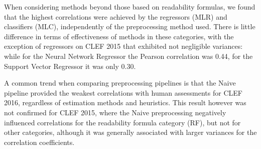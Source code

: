 When considering methods beyond those based on readability formulas, we found that the highest correlations were achieved by the regressors (MLR) and classifiers (MLC), independently of the preprocessing method used. There is little difference in terms of effectiveness of methods in these categories, with the exception of regressors on CLEF 2015 that exhibited not negligible variances: while for the Neural Network Regressor the Pearson correlation was 0.44, for the Support Vector Regressor it was only 0.30.

A common trend when comparing preprocessing pipelines is that the Naive pipeline provided the weakest correlations with human assessments for CLEF 2016, regardless of estimation methods and heuristics. This result however was not confirmed for CLEF 2015, where the Naive preprocessing negatively influenced correlations for the readability formula category (RF), but not for other categories, although it was generally associated with larger variances for the correlation coefficients.





